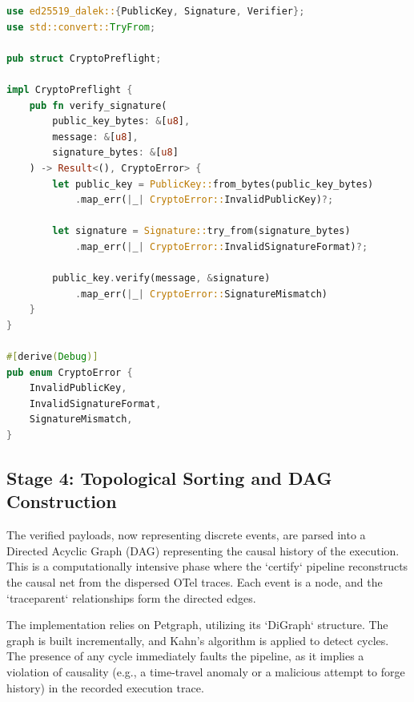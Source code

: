 \begin{lstlisting}[language=Rust, caption={Cryptographic pre-flight verification using ed25519}]
use ed25519_dalek::{PublicKey, Signature, Verifier};
use std::convert::TryFrom;

pub struct CryptoPreflight;

impl CryptoPreflight {
    pub fn verify_signature(
        public_key_bytes: &[u8],
        message: &[u8],
        signature_bytes: &[u8]
    ) -> Result<(), CryptoError> {
        let public_key = PublicKey::from_bytes(public_key_bytes)
            .map_err(|_| CryptoError::InvalidPublicKey)?;
            
        let signature = Signature::try_from(signature_bytes)
            .map_err(|_| CryptoError::InvalidSignatureFormat)?;
            
        public_key.verify(message, &signature)
            .map_err(|_| CryptoError::SignatureMismatch)
    }
}

#[derive(Debug)]
pub enum CryptoError {
    InvalidPublicKey,
    InvalidSignatureFormat,
    SignatureMismatch,
}
\end{lstlisting}

\subsection{Stage 4: Topological Sorting and DAG Construction}
The verified payloads, now representing discrete events, are parsed into a Directed Acyclic Graph (DAG) representing the causal history of the execution. This is a computationally intensive phase where the `certify` pipeline reconstructs the causal net from the dispersed OTel traces. Each event is a node, and the `traceparent` relationships form the directed edges.

The implementation relies on Petgraph, utilizing its `DiGraph` structure. The graph is built incrementally, and Kahn's algorithm is applied to detect cycles. The presence of any cycle immediately faults the pipeline, as it implies a violation of causality (e.g., a time-travel anomaly or a malicious attempt to forge history) in the recorded execution trace.

